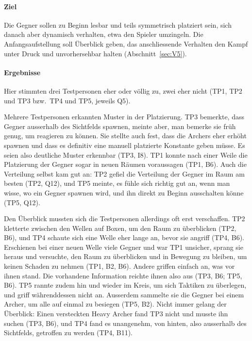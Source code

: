\documentclass[../Main.tex]{subfiles}
\begin{document}
\paragraph{Ziel}
Die Gegner sollen zu Beginn lesbar und teils symmetrisch platziert sein, sich danach aber dynamisch verhalten, etwa den Spieler umzingeln. Die Anfangsaufstellung soll Überblick geben, das anschliessende Verhalten den Kampf unter Druck und unvorhersehbar halten (Abschnitt~\ref{sec:V5}).

\paragraph{Ergebnisse}
Hier stimmten drei Testpersonen eher oder völlig zu, zwei eher nicht (TP1, TP2 und TP3 bzw.\ TP4 und TP5, jeweils Q5).

Mehrere Testpersonen erkannten Muster in der Platzierung. TP3 bemerkte, dass Gegner ausserhalb des Sichtfelds spawnen, meinte aber, man bemerke sie früh genug, um reagieren zu können. Sie stellte auch fest, dass die Archers eher erhöht spawnen und dass es definitiv eine manuell platzierte Konstante geben müsse. Es seien also deutliche Muster erkennbar (TP3, I8). TP1 konnte nach einer Weile die Platzierung der Gegner sogar in neuen Räumen voraussagen (TP1, B6). Auch die Verteilung selbst kam gut an: TP2 gefiel die Verteilung der Gegner im Raum am besten (TP2, Q12), und TP5 meinte, es fühle sich richtig gut an, wenn man wisse, wo ein Gegner spawnen wird, und ihn direkt zu Beginn ausschalten könne (TP5, Q12).

Den Überblick mussten sich die Testpersonen allerdings oft erst verschaffen. TP2 kletterte zwischen den Wellen auf Boxen, um den Raum zu überblicken (TP2, B6), und TP4 schaute sich eine Welle eher lange an, bevor sie angriff (TP4, B6). Erschienen bei einer neuen Welle viele Gegner und war TP1 unsicher, sprang sie heraus und versuchte, den Raum zu überblicken und in Bewegung zu bleiben, um keinen Schaden zu nehmen (TP1, B2, B6). Andere griffen einfach an, was vor ihnen stand. Die vorhandene Information reichte ihnen also aus (TP3, B6; TP5, B6). TP5 rannte zudem hin und wieder im Kreis, um sich Taktiken zu überlegen, und griff währenddessen nicht an. Ausserdem sammelte sie die Gegner bei einem Archer, um alle auf einmal zu besiegen (TP5, B2). Nicht immer gelang der Überblick: Einen versteckten Heavy Archer fand TP3 nicht und musste ihn suchen (TP3, B6), und TP4 fand es unangenehm, von hinten, also ausserhalb des Sichtfelds, getroffen zu werden (TP4, B11).
\end{document}
